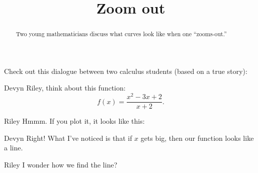 \documentclass{ximera}
\title[Break-Ground:]{Zoom out}
\begin{document}
\begin{abstract}
Two young mathematicians discuss what curves look like when one
``zooms-out.''
\end{abstract}
\maketitle

Check out this dialogue between two calculus students (based on a true
story):

\begin{dialogue}
\item[Devyn] Riley, think about this function:
  \[
  f(x) = \frac{x^2-3x+2}{x+2}.
  \]
\item[Riley] Hmmm. If you plot it, it looks like this:
  \begin{image}
  \end{image}
\item[Devyn] Right! What I've noticed is that if $x$ gets big, then
  our function looks like a line.
\item[Riley] I wonder how we find the line? 
\end{dialogue}

\begin{problem}
\end{problem}


\end{document}
